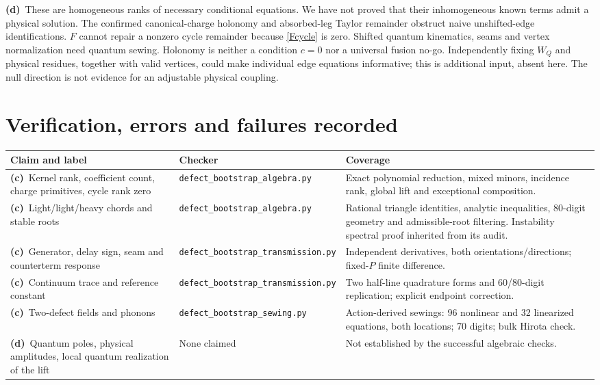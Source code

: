\documentclass[11pt,a4paper]{article}
\newcommand{\C}{\textbf{(c)}\ }
\newcommand{\D}{\textbf{(d)}\ }
\newcommand{\file}[1]{\nolinkurl{#1}}
\newcommand{\alg}{\file{defect_bootstrap_algebra.py}}
\newcommand{\tra}{\file{defect_bootstrap_transmission.py}}
\newcommand{\sew}{\file{defect_bootstrap_sewing.py}}
\begin{document}
\D These are homogeneous ranks of necessary conditional equations. We have
not proved that their inhomogeneous known terms admit a physical solution.
The confirmed canonical-charge holonomy and absorbed-leg Taylor remainder
obstruct naive unshifted-edge identifications. $F$ cannot repair a nonzero
cycle remainder because \eqref{Fcycle} is zero. Shifted quantum kinematics,
seams and vertex normalization need quantum sewing. Holonomy is neither
a condition $c=0$ nor a universal fusion no-go. Independently fixing $W_Q$
and physical residues, together with valid vertices, could make individual
edge equations informative; this is additional input, absent here. The null
direction is not evidence for an adjustable physical coupling.

\section{Verification, errors and failures recorded}
\begin{longtable}{@{}L{5cm}L{3.2cm}L{7cm}@{}}\toprule
Claim and label & Checker & Coverage\\\midrule\endhead
\C Kernel rank, coefficient count, charge primitives, cycle rank zero
& \alg & Exact polynomial reduction, mixed minors, incidence rank,
global lift and exceptional composition.\\
\C Light/light/heavy chords and stable roots & \alg & Rational triangle
identities, analytic inequalities, 80-digit geometry and admissible-root
filtering. Instability spectral proof inherited from its audit.\\
\C Generator, delay sign, seam and counterterm response & \tra & Independent
derivatives, both orientations/directions; fixed-$P$ finite difference.\\
\C Continuum trace and reference constant & \tra & Two half-line quadrature
forms and 60/80-digit replication; explicit endpoint correction.\\
\C Two-defect fields and phonons & \sew & Action-derived sewings: 96 nonlinear
and 32 linearized equations, both locations; 70 digits; bulk Hirota check.\\
\D Quantum poles, physical amplitudes, local quantum realization of the lift
& None claimed & Not established by the successful algebraic checks.\\
\bottomrule\end{longtable}
\end{document}
